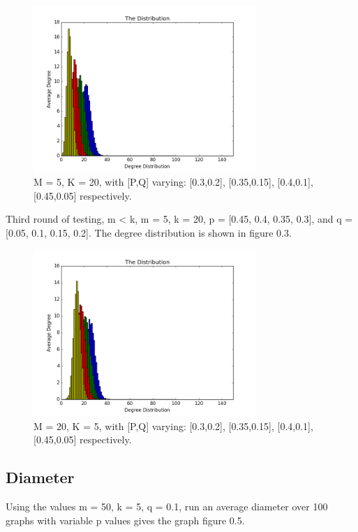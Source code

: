 \documentclass[paper=a4, fontsize=11pt]{scrartcl}
\numberwithin{equation}{section}		%
\numberwithin{figure}{section}			%
\numberwithin{table}{section}				%
\begin{document}
\begin{figure}[h]
\center
\caption{M = 5, K = 20, with [P,Q] varying: [0.3,0.2], [0.35,0.15], [0.4,0.1], [0.45,0.05] respectively.}
\includegraphics[width=0.75\textwidth]{pictures/m>k.png}
\end{figure}

Third round of testing, m < k, m = 5, k = 20, p = [0.45, 0.4, 0.35, 0.3], and q = [0.05, 0.1, 0.15, 0.2]. The degree distribution is shown in figure 0.3.

\begin{figure}[h]
\center
\caption{M = 20, K = 5, with [P,Q] varying: [0.3,0.2], [0.35,0.15], [0.4,0.1], [0.45,0.05] respectively.}
\includegraphics[width=0.75\textwidth]{pictures/m<k.png}
\end{figure}

\subsection*{Diameter}

Using the values m = 50, k = 5, q = 0.1, run an average diameter over 100 graphs with variable p values gives the graph figure 0.5.
\end{document}
